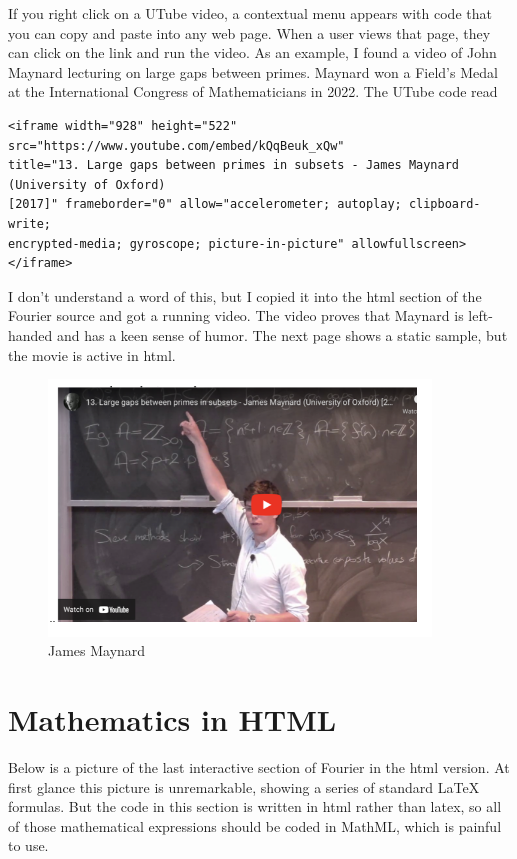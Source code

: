 \documentclass[11pt, oneside]{article}   	%
\begin{document}
If you right click on a UTube video, a contextual menu appears with code that you
can copy and paste into any web page. When a user views that page, they can click
on the link and run the video.
As an example, I found a video of
John Maynard lecturing on large gaps between primes. Maynard won a Field's Medal
at the International Congress of Mathematicians in 2022. The UTube code read
\begin{verbatim}
<iframe width="928" height="522" src="https://www.youtube.com/embed/kQqBeuk_xQw"
title="13. Large gaps between primes in subsets - James Maynard (University of Oxford)
[2017]" frameborder="0" allow="accelerometer; autoplay; clipboard-write;
encrypted-media; gyroscope; picture-in-picture" allowfullscreen></iframe>
\end{verbatim}
I don't understand a word of this, but I copied it into the html section of the Fourier source
and got a running video. The video proves that Maynard is left-handed and has
a keen sense of humor. The next page shows a static sample, but the movie is active in html.
\newpage
 \begin{figure}[htbp] %
     \centering
     \includegraphics[width=4in]{image5.png} 
     \caption{James Maynard}
     \label{fig:example}
  \end{figure}
 
\section{Mathematics in HTML}

Below is a picture of the last interactive section of Fourier in the html version. At first
glance this picture is unremarkable, showing a series of standard LaTeX formulas. But the code
in this section is written in html rather than latex, so all of those mathematical expressions should be coded in MathML, which is painful to use.
\end{document}
